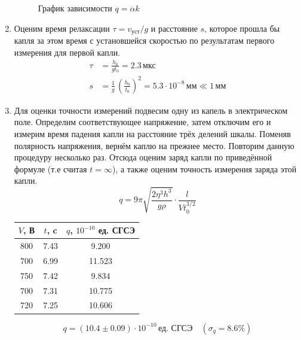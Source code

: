 \documentclass[12pt]{article}
\begin{document}
\begin{enumerate}
\begin{figure}[h!]
		\caption{График зависимости $q = \alpha k$}
	\end{figure}
   \item
   		Оценим время релаксации $\tau = v_\text{уст} / g$ и расстояние $s$, которое прошла бы капля за этом время с установшейся скоростью по результатам первого измерения для первой капли.
   		\begin{align*}
   			\tau &= \frac{h_0}{g t_0} = 2.3 \, \text{мкс} \\
   			s &= \frac{1}{g}\, \left(\frac{h_0}{t_0}\right)^2 = 5.3 \cdot 10^{-8} \, \text{мм} \ll 1 \, \text{мм}
   		\end{align*}
   	\item
   		Для оценки точности измерений подвесим одну из капель в электрическом поле. Определим соответствующее напряжение, затем отключим его и измерим время падения капли на расстояние трёх делений шкалы. Поменяв полярность напряжения, вернём каплю на прежнее место. Повторим данную процедуру несколько раз. Отсюда оценим заряд капли по приведённой формуле (т.е считая $t = \infty$), а также оценим точность измерения заряда этой капли.
   		\[
   			q = 9 \pi \sqrt{\frac{2 \eta^3 h^3}{g \rho}} \cdot \frac{l}{V t_0^{3/2}}
   		\]
   		\begin{table}[h!]
   			\centering
   			\begin{tabular}{|c|c|c|}
   			\hline
   			$V$, В & $t$, c & $q$, $10^{-10}$ ед. СГСЭ \\
   			\hline
   			800 & 7.43 & 9.200\\
   			\hline
   			700 & 6.99 & 11.523\\
   			\hline
   			750 & 7.42 & 9.834\\
   			\hline
   			700 & 7.31 & 10.775\\
   			\hline
   			720 & 7.25 & 10.606\\
   			\hline
   			\end{tabular}
   		\end{table}	
		\[
			q = \left(10.4 \pm 0.09 \right) \cdot 10^{-10} \, \text{ед. СГСЭ} \quad \left(\sigma_q = 8.6 \%\right)
		\]	   		
   		
\end{enumerate}	
	
\end{document}
